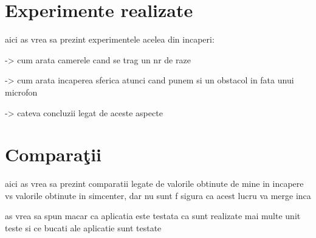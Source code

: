 \section{Experimente realizate}

	aici as vrea sa prezint experimentele acelea din incaperi:
	
	-> cum arata camerele cand se trag un nr de raze
	
	-> cum arata incaperea sferica atunci cand punem si un obstacol in fata unui microfon
	
	-> cateva concluzii legat de aceste aspecte 
	
\section{Compara\c{t}ii}

	aici as vrea sa prezint comparatii legate de valorile obtinute de mine in incapere vs valorile obtinute in simcenter, dar nu sunt f sigura ca acest lucru va merge inca 
	
	as vrea sa spun macar ca aplicatia este testata ca sunt realizate mai multe unit teste si ce bucati ale aplicatie sunt testate